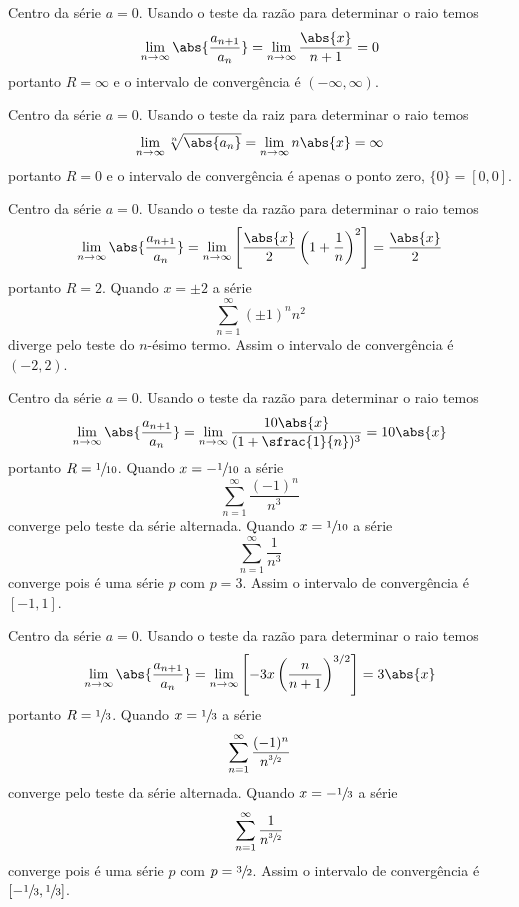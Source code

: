 \begin{exercises}
\begin{exercise}
\begin{answer}
\begin{alphalist}
  \item Centro da série $a=0$.
  Usando o teste da razão para determinar o raio temos
  \[
    \lim_{n\to\infty}\abs{\frac{a_{n+1}}{a_n}} =
    \lim_{n\to\infty} \frac{\abs{x}}{n+1} = 0
  \]
  portanto $R=\infty$ e o intervalo de convergência é $(-\infty, \infty)$.

  \item Centro da série $a=0$.
  Usando o teste da raiz para determinar o raio temos
  \[
    \lim_{n\to\infty}\sqrt[n]{\abs{a_n}} =
    \lim_{n\to\infty} n\abs{x} = \infty
  \]
  portanto $R=0$ e o intervalo de convergência é apenas o ponto zero, $\{0\}=[0, 0]$.

  \item Centro da série $a=0$.
  Usando o teste da razão para determinar o raio temos
  \[
    \lim_{n\to\infty}\abs{\frac{a_{n+1}}{a_n}} =
    \lim_{n\to\infty} \left[\frac{\abs{x}}{2}\left(1+\frac{1}{n}\right)^2\right] =
    \frac{\abs{x}}{2}
  \]
  portanto $R=2$.
  Quando $x=\pm 2$ a série
  \[
    \sum_{n=1}^{\infty} (\pm1)^nn^2
  \]
  diverge pelo teste do $n$-ésimo termo.
  Assim o intervalo de convergência é $(-2, 2)$.

  \item Centro da série $a=0$.
  Usando o teste da razão para determinar o raio temos
  \[
    \lim_{n\to\infty}\abs{\frac{a_{n+1}}{a_n}} =
    \lim_{n\to\infty} \frac{10\abs{x}}{(1+\sfrac{1}{n})^3} =
    10\abs{x}
  \]
  portanto $R=\sfrac{1}{10}$.
  Quando $x=-\sfrac{1}{10}$ a série
  \[
    \sum_{n=1}^{\infty} \frac{(-1)^n}{n^3}
  \]
  converge pelo teste da série alternada.
  Quando $x= \sfrac{1}{10}$ a série
  \[
    \sum_{n=1}^{\infty} \frac{1}{n^3}
  \]
  converge pois é uma série $p$ com $p=3$.
  Assim o intervalo de convergência é $[-1, 1]$.

  \item Centro da série $a=0$.
  Usando o teste da razão para determinar o raio temos
  \[
    \lim_{n\to\infty}\abs{\frac{a_{n+1}}{a_n}} =
    \lim_{n\to\infty} \left[-3x\left(\frac{n}{n+1}\right)^{3/2}\right] =
    3\abs{x}
  \]
  portanto $R=\sfrac{1}{3}$.
  Quando $x= \sfrac{1}{3}$ a série
  \[
    \sum_{n=1}^{\infty} \frac{(-1)^n}{n^{\sfrac{3}{2}}}
  \]
  converge pelo teste da série alternada.
  Quando $x=-\sfrac{1}{3}$ a série
  \[
    \sum_{n=1}^{\infty} \frac{1}{n^{\sfrac{3}{2}}}
  \]
  converge pois é uma série $p$ com $p=\sfrac{3}{2}$.
  Assim o intervalo de convergência é $\left[-\sfrac{1}{3}, \sfrac{1}{3}\right]$.


\end{alphalist}
\end{answer}
\end{exercise}
\end{exercises}
